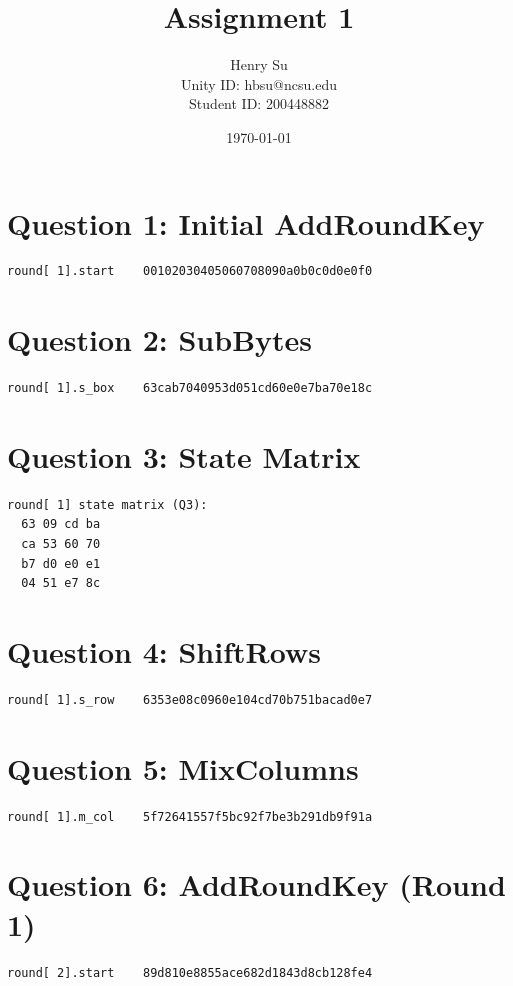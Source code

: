 \documentclass[11pt]{article}
\title{Assignment 1}
\author{Henry Su \\ Unity ID: hbsu@ncsu.edu \\ Student ID: 200448882}
\date{\today}
\begin{document}
\maketitle

\section*{Question 1: Initial AddRoundKey}
\begin{verbatim}
round[ 1].start    00102030405060708090a0b0c0d0e0f0
\end{verbatim}

\section*{Question 2: SubBytes}
\begin{verbatim}
round[ 1].s_box    63cab7040953d051cd60e0e7ba70e18c
\end{verbatim}

\section*{Question 3: State Matrix}
\begin{verbatim}
round[ 1] state matrix (Q3):
  63 09 cd ba
  ca 53 60 70
  b7 d0 e0 e1
  04 51 e7 8c
\end{verbatim}

\section*{Question 4: ShiftRows}
\begin{verbatim}
round[ 1].s_row    6353e08c0960e104cd70b751bacad0e7
\end{verbatim}

\section*{Question 5: MixColumns}
\begin{verbatim}
round[ 1].m_col    5f72641557f5bc92f7be3b291db9f91a
\end{verbatim}

\section*{Question 6: AddRoundKey (Round 1)}
\begin{verbatim}
round[ 2].start    89d810e8855ace682d1843d8cb128fe4
\end{verbatim}
\end{document}
